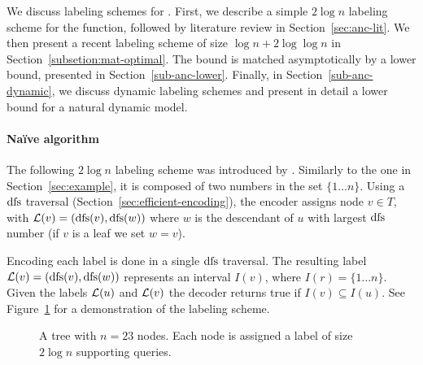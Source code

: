 	We discuss labeling schemes for \ancestry.
	First, we describe  a simple $2 \log n$ labeling scheme for the function, followed by literature review in Section~\ref{sec:anc-lit}.
	We then present a recent labeling scheme  of size $\log n + 2\log \log n$ in Section~\ref{subsetion:mat-optimal}.
	The bound is matched  asymptotically by a  lower bound, presented in Section~\ref{sub-anc-lower}.
	Finally, in Section~\ref{sub-anc-dynamic}, we  discuss dynamic \ancestry labeling schemes and present in detail a lower bound for a natural dynamic model.

		\paragraph{Na\"ive algorithm}\label{section:NaiveAncestry}
		The following $2 \log n $ \ancestry labeling scheme was introduced by .
		Similarly to the one in Section~\ref{sec:example}, it is composed of  two numbers in the set $\{1 \dots n\}$.
		Using a $\operatorname{dfs}$ traversal (Section~\ref{sec:efficient-encoding}), the encoder assigns   node $v \in T$, with  $  \mathcal{L}(v) =  (\operatorname{dfs}(v),\operatorname{dfs}(w))$ where $w$ is the descendant of $u$ with largest $\operatorname{dfs}$ number  (if $v$ is a leaf we set $w=v$).
		 
		Encoding each label is done in a single $\operatorname{dfs}$ traversal.
		The resulting label $ \mathcal{L}(v)=(\operatorname{dfs}(v),\operatorname{dfs}(w))$  represents an interval $I(v)$, where  $I(r) =  \{1 \dots n\}$.
		Given the labels $ \mathcal{L}(u)$ and $ \mathcal{L}(v)$ the decoder  returns true if  $I(v) \subseteq I(u)$.
		 See Figure~\ref{fig:simple-ancestry} for a demonstration of the labeling scheme.
			  
			  
\begin{figure}[!ht]
\centering
{}
\caption{
A tree with $n=23$ nodes. Each node is assigned a label of size $2 \log n$ supporting \ancestry queries.} \label{fig:simple-ancestry}
\end{figure}
			

